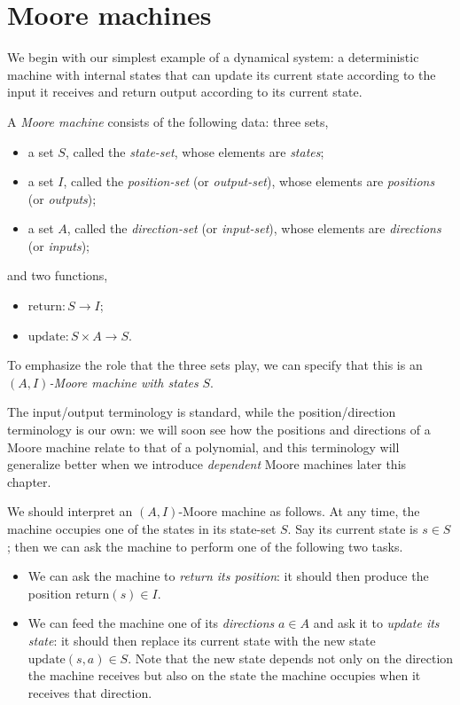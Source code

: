 \documentclass[Book-Poly]{subfiles}
\begin{document}
\section{Moore machines}\label{sec.poly.dyn_sys.moore}

We begin with our simplest example of a dynamical system: a deterministic machine with internal states that can update its current state according to the input it receives and return output according to its current state.

\begin{definition}\label{def.moore_machine}
  A \emph{Moore machine} consists of the following data: three sets,
  \begin{itemize}
    \item a set $S$, called the \emph{state-set}, whose elements are \emph{states};
    \item a set $I$, called the \emph{position-set} (or \emph{output-set}), whose elements are \emph{positions} (or \emph{outputs});
    \item a set $A$, called the \emph{direction-set} (or \emph{input-set}), whose elements are \emph{directions} (or \emph{inputs});
  \end{itemize}
  and two functions,
  \begin{itemize}
    \item $\text{return}\colon S\to I$;
    \item $\text{update}\colon S\times A\to S$.
  \end{itemize}
  To emphasize the role that the three sets play, we can specify that this is an $(A,I)$\emph{-Moore machine with states} $S$.
\end{definition}

The input/output terminology is standard, while the position/direction terminology is our own: we will soon see how the positions and directions of a Moore machine relate to that of a polynomial, and this terminology will generalize better when we introduce \emph{dependent} Moore machines later this chapter.

We should interpret an $(A,I)$-Moore machine as follows.
At any time, the machine occupies one of the states in its state-set $S$.
Say its current state is $s\in S$; then we can ask the machine to perform one of the following two tasks.
\begin{itemize}
  \item We can ask the machine to \emph{return its position}: it should then produce the position $\text{return}(s) \in I$.
  \item We can feed the machine one of its \emph{directions} $a\in A$ and ask it to \emph{update its state}: it should then replace its current state with the new state $\text{update}(s,a)\in S$.
  Note that the new state depends not only on the direction the machine receives but also on the state the machine occupies when it receives that direction.
\end{itemize}
\end{document}
